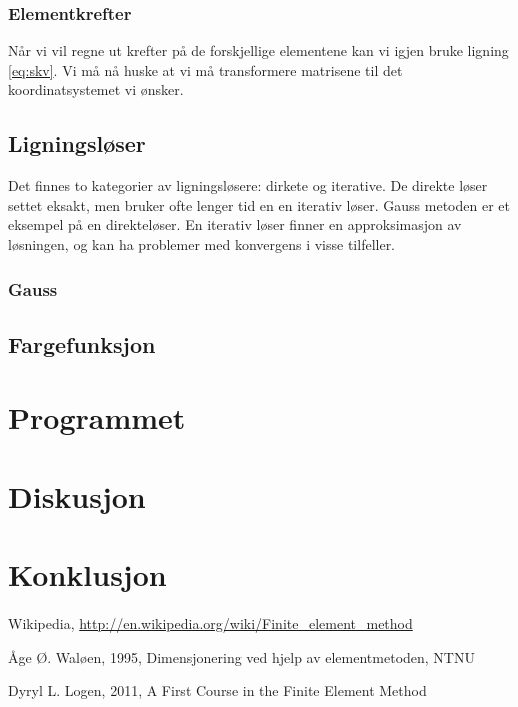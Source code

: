 \documentclass[10pt,a4paper, norsk]{article}
\begin{document}
\subsubsection*{Elementkrefter}
Når vi vil regne ut krefter på de forskjellige elementene kan vi igjen bruke ligning \ref{eq:skv}. Vi må nå huske at vi må transformere matrisene til det koordinatsystemet vi ønsker. 


\subsection*{Ligningsløser}
Det finnes to kategorier av ligningsløsere: dirkete og iterative. De direkte løser settet eksakt, men bruker ofte lenger tid en en iterativ løser. Gauss metoden er et eksempel på en direkteløser. En iterativ løser finner en approksimasjon av løsningen, og kan ha problemer med konvergens i visse tilfeller. 

\subsubsection*{Gauss}




\subsection*{Fargefunksjon}





\section*{Programmet} 


\section*{Diskusjon}


\section*{Konklusjon}

\paragraph{} 


\begin{thebibliography}{9}

  Wikipedia,
  \url{http://en.wikipedia.org/wiki/Finite_element_method}
  

  Åge Ø. Waløen,
  1995, 
  Dimensjonering ved hjelp av elementmetoden, NTNU
 
	Dyryl L. Logen, 2011, A First Course in the Finite Element Method


\end{thebibliography}
\end{document}
